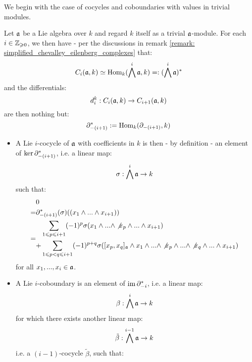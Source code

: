         We begin with the case of cocycles and coboundaries with values in trivial modules. 
        \begin{example} \label{example: lie_cocycles_and_coboundaries_with_trivial_coefficients}
            Let $\mathfrak{a}$ be a Lie algebra over $k$ and regard $k$ itself as a trivial $\mathfrak{a}$-module. For each $i \in \mathbb{Z}_{\geqslant 0}$, we then have - per the discussions in remark \ref{remark: simplified_chevalley_eilenberg_complexes} that:
                $$C_i(\mathfrak{a}, k) \simeq \mathrm{Hom}_k(\bigwedge^i \mathfrak{a}, k) =: (\bigwedge^i \mathfrak{a})^*$$
            and the differentials:
                $$d_i^k: C_i(\mathfrak{a}, k) \to C_{i + 1}(\mathfrak{a}, k)$$
            are then nothing but:
                $$\partial_{-(i + 1)}^* := \mathrm{Hom}_k(\partial_{-(i + 1)}, k)$$
            \begin{itemize}
                \item A Lie $i$-cocycle of $\mathfrak{a}$ with coefficients in $k$ is then - by definition - an element of $\ker \partial_{-(i + 1)}^*$, i.e. a linear map:
                    $$\sigma: \bigwedge^i \mathfrak{a} \to k$$
                such that:
                    $$
                        \begin{aligned}
                            & 0
                            \\
                            = & \partial_{-(i + 1)}^*(\sigma)( (x_1 \wedge ... \wedge x_{i + 1}) )
                            \\
                            = &
                            \begin{aligned}
                                & \sum_{1 \leqslant p \leqslant i + 1} (-1)^p \sigma(x_1 \wedge ... \wedge \not{x_p} \wedge ... \wedge x_{i + 1})
                                \\
                                + & \sum_{1 \leqslant p < q \leqslant i + 1} (-1)^{p + q} \sigma( [x_p, x_q]_{\mathfrak{a}} \wedge x_1 \wedge ... \wedge \not{x_p} \wedge ... \wedge \not{x_q} \wedge ... \wedge x_{i + 1})
                            \end{aligned}
                        \end{aligned}
                    $$
                for all $x_1, ..., x_i \in \mathfrak{a}$.
                \item A Lie $i$-coboundary is an element of $\operatorname{im} \partial_{-i}^*$, i.e. a linear map:
                    $$\beta: \bigwedge^i \mathfrak{a} \to k$$
                for which there exists another linear map:
                    $$\tilde{\beta}: \bigwedge^{i - 1} \mathfrak{a} \to k$$
                i.e. a $(i - 1)$-cocycle $\tilde{\beta}$, such that:

\end{itemize}
\end{example}
